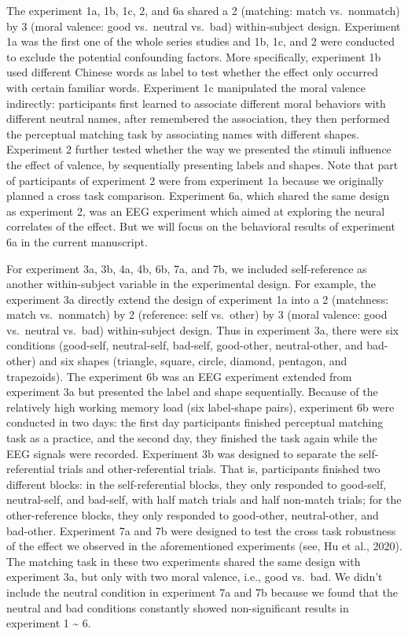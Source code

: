 \documentclass[
  english,
  man]{apa6}
\begin{document}
The experiment 1a, 1b, 1c, 2, and 6a shared a 2 (matching: match vs.~nonmatch) by 3 (moral valence: good vs.~neutral vs.~bad) within-subject design. Experiment 1a was the first one of the whole series studies and 1b, 1c, and 2 were conducted to exclude the potential confounding factors. More specifically, experiment 1b used different Chinese words as label to test whether the effect only occurred with certain familiar words. Experiment 1c manipulated the moral valence indirectly: participants first learned to associate different moral behaviors with different neutral names, after remembered the association, they then performed the perceptual matching task by associating names with different shapes. Experiment 2 further tested whether the way we presented the stimuli influence the effect of valence, by sequentially presenting labels and shapes. Note that part of participants of experiment 2 were from experiment 1a because we originally planned a cross task comparison. Experiment 6a, which shared the same design as experiment 2, was an EEG experiment which aimed at exploring the neural correlates of the effect. But we will focus on the behavioral results of experiment 6a in the current manuscript.

For experiment 3a, 3b, 4a, 4b, 6b, 7a, and 7b, we included self-reference as another within-subject variable in the experimental design. For example, the experiment 3a directly extend the design of experiment 1a into a 2 (matchness: match vs.~nonmatch) by 2 (reference: self vs.~other) by 3 (moral valence: good vs.~neutral vs.~bad) within-subject design. Thus in experiment 3a, there were six conditions (good-self, neutral-self, bad-self, good-other, neutral-other, and bad-other) and six shapes (triangle, square, circle, diamond, pentagon, and trapezoids). The experiment 6b was an EEG experiment extended from experiment 3a but presented the label and shape sequentially. Because of the relatively high working memory load (six label-shape pairs), experiment 6b were conducted in two days: the first day participants finished perceptual matching task as a practice, and the second day, they finished the task again while the EEG signals were recorded. Experiment 3b was designed to separate the self-referential trials and other-referential trials. That is, participants finished two different blocks: in the self-referential blocks, they only responded to good-self, neutral-self, and bad-self, with half match trials and half non-match trials; for the other-reference blocks, they only responded to good-other, neutral-other, and bad-other. Experiment 7a and 7b were designed to test the cross task robustness of the effect we observed in the aforementioned experiments (see, Hu et al., 2020). The matching task in these two experiments shared the same design with experiment 3a, but only with two moral valence, i.e., good vs.~bad. We didn't include the neutral condition in experiment 7a and 7b because we found that the neutral and bad conditions constantly showed non-significant results in experiment 1 \textasciitilde{} 6.
\end{document}
